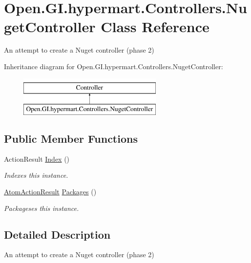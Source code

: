 \hypertarget{class_open_1_1_g_i_1_1hypermart_1_1_controllers_1_1_nuget_controller}{}\section{Open.\+G\+I.\+hypermart.\+Controllers.\+Nuget\+Controller Class Reference}
\label{class_open_1_1_g_i_1_1hypermart_1_1_controllers_1_1_nuget_controller}


An attempt to create a Nuget controller (phase 2)  


Inheritance diagram for Open.\+G\+I.\+hypermart.\+Controllers.\+Nuget\+Controller\+:\begin{figure}[H]
\begin{center}
\leavevmode
\includegraphics[height=2.000000cm]{class_open_1_1_g_i_1_1hypermart_1_1_controllers_1_1_nuget_controller}
\end{center}
\end{figure}
\subsection*{Public Member Functions}
\begin{DoxyCompactItemize}
\item 
Action\+Result \hyperlink{class_open_1_1_g_i_1_1hypermart_1_1_controllers_1_1_nuget_controller_a4512f0f0edfb480430dea27f009d37a6}{Index} ()
\begin{DoxyCompactList}\small\item\em Indexes this instance. \end{DoxyCompactList}\item 
\hyperlink{class_open_1_1_g_i_1_1hypermart_1_1_helpers_1_1_atom_action_result}{Atom\+Action\+Result} \hyperlink{class_open_1_1_g_i_1_1hypermart_1_1_controllers_1_1_nuget_controller_a8b2f4aa532a73eaacab1efcfd3fed054}{Packages} ()
\begin{DoxyCompactList}\small\item\em Packageses this instance. \end{DoxyCompactList}\end{DoxyCompactItemize}


\subsection{Detailed Description}
An attempt to create a Nuget controller (phase 2) 

